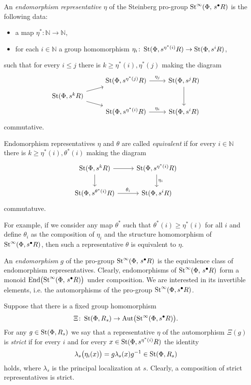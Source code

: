 \documentclass[oneside, 11pt]{amsart} \pdfoutput=1
\begin{document}
\begin{df}
An {\it endomorphism representative} $\eta$ of the Steinberg pro-group $\mathop{\mathrm{St}}\nolimits^\infty(\Phi,\,s^\bullet R)$ is the following data: 
\begin{itemize}
\item
a map $\eta^* \colon \mathbb N \to \mathbb N$,
\item
for each $i \in \mathbb N$ a group homomorphism $\eta_i \colon \mathop{\mathrm{St}}\nolimits(\Phi, s^{\eta^*(i)} R) \to \mathop{\mathrm{St}}\nolimits(\Phi, s^i R)$,
\end{itemize}
such that for every $i \leq j$ there is $k \geq \eta^*(i), \eta^*(j)$ making the diagram
$$\begin{tikzcd}[row sep=tiny]
& \St(\Phi, s^{\eta^*(j)} R)\ar{r}{\eta_j} & \St(\Phi, s^j R) \ar{dd}\\
\St(\Phi, s^k R) \ar{ur} \ar{dr} & &\\
&\St(\Phi, s^{\eta^*(i)} R) \ar{r}{\eta_i} & \St(\Phi, s^i R)
\end{tikzcd}$$
commutative.

Endomorphism representatives $\eta$ and $\theta$ are called {\it equivalent} if for every $i \in \mathbb N$ there is $k \geq \eta^*(i), \theta^*(i)$ making the diagram
$$\begin{tikzcd}
\St(\Phi, s^k R) \ar{r} \ar{d} & \St(\Phi, s^{\eta^*(i)} R) \ar{d}{\eta_i}\\
\St(\Phi, s^{\theta^*(i)} R) \ar{r}{\theta_i} & \St(\Phi, s^i R)
\end{tikzcd}$$
commutatuve.

For example, if we consider any map $\theta^*$ such that $\theta^*(i) \geq \eta^*(i)$ for all $i$ and define $\theta_i$ as the composition of $\eta_i$ and the structure homomorphism of $\mathop{\mathrm{St}}\nolimits^\infty(\Phi, s^\bullet R)$, then such a representative $\theta$ is equivalent to $\eta$.

An {\it endomorphism} $g$ of the pro-group $\mathop{\mathrm{St}}\nolimits^\infty(\Phi,\,s^\bullet R)$ is the equivalence class of endomorphism representatives. Clearly, endomorphisms of $\mathop{\mathrm{St}}\nolimits^\infty(\Phi,\,s^\bullet R)$ form a monoid $\mathrm{End}\bigl(\mathop{\mathrm{St}}\nolimits^\infty(\Phi,\,s^\bullet R)\bigr)$ under composition. We are interested in its invertible elements, i.e. the automorphisms of the pro-group \(\mathop{\mathrm{St}}\nolimits^\infty(\Phi, s^\bullet R)\).

Suppose that there is a fixed group homomorphism $$\Xi \colon \mathop{\mathrm{St}}\nolimits(\Phi, R_s) \to \mathrm{Aut}\bigl(\mathop{\mathrm{St}}\nolimits^\infty(\Phi, s^\bullet R)\bigr).$$ For any $g \in \mathop{\mathrm{St}}\nolimits(\Phi, R_s)$ we say that a representative $\eta$ of the automorphism $\Xi(g)$ is {\it strict} if for every $i$ and for every $x \in \mathop{\mathrm{St}}\nolimits(\Phi, s^{\eta^*(i)} R)$ the identity
$$
\lambda_s\bigl(\eta_i(x)\bigr) = g \lambda_s(x) g^{-1} \in \mathop{\mathrm{St}}\nolimits(\Phi, R_s)
$$
holds, where $\lambda_s$ is the principal localization at $s$. Clearly, a composition of strict representatives is strict.
\end{df}
\end{document}
